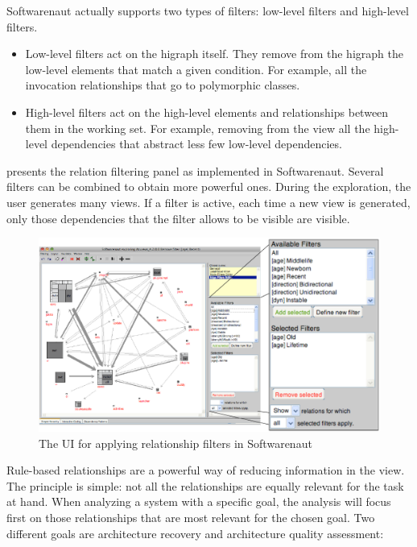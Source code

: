 \documentclass[preprint,12pt]{elsarticle}
\begin{document}
Softwarenaut actually supports two types of filters: low-level filters and high-level filters.

\begin{itemize}

\item Low-level filters act on the higraph itself. They remove from the higraph the low-level elements that match a given condition. For example, all the invocation relationships that go to polymorphic classes.

\item High-level filters act on the high-level elements and relationships between them in the working set. For example, removing from the view all the high-level dependencies that abstract less few low-level dependencies.
\end{itemize}


 presents the relation filtering panel as implemented in Softwarenaut. Several filters can be combined to obtain more powerful ones. During the exploration, the user generates many views. If a filter is active, each time a new view is generated, only those dependencies that the filter allows to be visible are visible.


\begin{figure}[h]
\begin{center}
\includegraphics[width=\linewidth]{images/SnautFilteringPanel}
\caption{The UI for applying relationship filters in Softwarenaut}
\end{center}
\end{figure}


Rule-based relationships are a powerful way of reducing information in the view. The principle is simple: not all the relationships are equally relevant for the task at hand. When analyzing a system with a specific goal, the analysis will focus first on those relationships that are most relevant for the chosen goal. Two different goals are architecture recovery and architecture quality assessment: 
\end{document}
